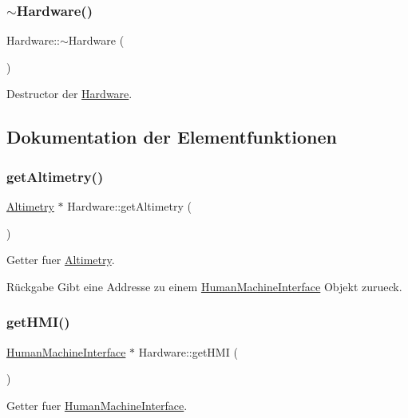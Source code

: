 \subsubsection{\texorpdfstring{$\sim$\+Hardware()}{~Hardware()}}
{\footnotesize\ttfamily Hardware\+::$\sim$\+Hardware (\begin{DoxyParamCaption}{ }\end{DoxyParamCaption})}

Destructor der \hyperlink{class_hardware}{Hardware}. 

\subsection{Dokumentation der Elementfunktionen}
\hypertarget{class_hardware_afa1aaabe0d2433e35e6efd735fa15daf}{}\label{class_hardware_afa1aaabe0d2433e35e6efd735fa15daf} 
\subsubsection{\texorpdfstring{get\+Altimetry()}{getAltimetry()}}
{\footnotesize\ttfamily \hyperlink{class_altimetry}{Altimetry} $\ast$ Hardware\+::get\+Altimetry (\begin{DoxyParamCaption}{ }\end{DoxyParamCaption})}

Getter fuer \hyperlink{class_altimetry}{Altimetry}.

\begin{DoxyReturn}{Rückgabe}
Gibt eine Addresse zu einem \hyperlink{class_human_machine_interface}{Human\+Machine\+Interface} Objekt zurueck. 
\end{DoxyReturn}
\hypertarget{class_hardware_aec8f013270ef5d6e79afed214b5c18cf}{}\label{class_hardware_aec8f013270ef5d6e79afed214b5c18cf} 
\subsubsection{\texorpdfstring{get\+H\+M\+I()}{getHMI()}}
{\footnotesize\ttfamily \hyperlink{class_human_machine_interface}{Human\+Machine\+Interface} $\ast$ Hardware\+::get\+H\+MI (\begin{DoxyParamCaption}{ }\end{DoxyParamCaption})}

Getter fuer \hyperlink{class_human_machine_interface}{Human\+Machine\+Interface}.

